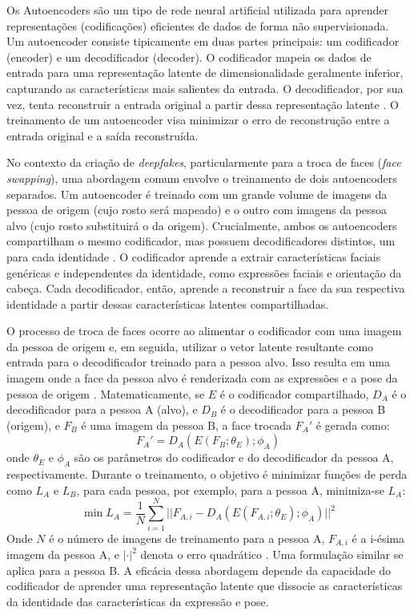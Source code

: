 
Os Autoencoders são um tipo de rede neural artificial utilizada para aprender representações (codificações) eficientes de dados de forma não supervisionada. Um autoencoder consiste tipicamente em duas partes principais: um codificador (encoder) e um decodificador (decoder). O codificador mapeia os dados de entrada para uma representação latente de dimensionalidade geralmente inferior, capturando as características mais salientes da entrada. O decodificador, por sua vez, tenta reconstruir a entrada original a partir dessa representação latente \cite{jin2021analise}. O treinamento de um autoencoder visa minimizar o erro de reconstrução entre a entrada original e a saída reconstruída.

No contexto da criação de \textit{deepfakes}, particularmente para a troca de faces (\textit{face swapping}), uma abordagem comum envolve o treinamento de dois autoencoders separados. Um autoencoder é treinado com um grande volume de imagens da pessoa de origem (cujo rosto será mapeado) e o outro com imagens da pessoa alvo (cujo rosto substituirá o da origem). Crucialmente, ambos os autoencoders compartilham o mesmo codificador, mas possuem decodificadores distintos, um para cada identidade \cite{langguth2021dont}. O codificador aprende a extrair características faciais genéricas e independentes da identidade, como expressões faciais e orientação da cabeça. Cada decodificador, então, aprende a reconstruir a face da sua respectiva identidade a partir dessas características latentes compartilhadas.

O processo de troca de faces ocorre ao alimentar o codificador com uma imagem da pessoa de origem e, em seguida, utilizar o vetor latente resultante como entrada para o decodificador treinado para a pessoa alvo. Isso resulta em uma imagem onde a face da pessoa alvo é renderizada com as expressões e a pose da pessoa de origem \cite{langguth2021dont}. Matematicamente, se $E$ é o codificador compartilhado, $D_{A}$ é o decodificador para a pessoa A (alvo), e $D_{B}$ é o decodificador para a pessoa B (origem), e $F_{B}$ é uma imagem da pessoa B, a face trocada $F_{A}'$ é gerada como:
\begin{equation}
F_A' = D_A(E(F_B; \theta_E); \phi_A)
\label{eq:deepfake_autoencoder_swap_v2}
\end{equation}
onde $\theta_E$ e $\phi_A$ são os parâmetros do codificador e do decodificador da pessoa A, respectivamente. Durante o treinamento, o objetivo é minimizar funções de perda como $L_A$ e $L_B$, para cada pessoa, por exemplo, para a pessoa A, minimiza-se $L_A$:
\begin{equation}
\min L_A = \frac{1}{N}\sum_{i=1}^{N} || F_{A,i} - D_A(E(F_{A,i}; \theta_E); \phi_A) ||^2
\label{eq:deepfake_autoencoder_train_A_v2}
\end{equation}
Onde $N$ é o número de imagens de treinamento para a pessoa A, $F_{A,i}$ é a i-ésima imagem da pessoa A, e $|\cdot|^{2}$ denota o erro quadrático \cite{jin2021analise}. Uma formulação similar se aplica para a pessoa B. A eficácia dessa abordagem depende da capacidade do codificador de aprender uma representação latente que dissocie as características da identidade das características da expressão e pose.


